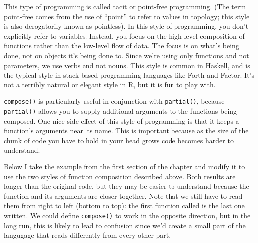 This type of programming is called tacit or point-free programming. (The
term point-free comes from the use of ``point'' to refer to values in
topology; this style is also derogatorily known as pointless). In this
style of programming, you don't explicitly refer to variables. Instead,
you focus on the high-level composition of functions rather than the
low-level flow of data. The focus is on what's being done, not on
objects it's being done to. Since we're using only functions and not
parameters, we use verbs and not nouns. This style is common in Haskell,
and is the typical style in stack based programming languages like Forth
and Factor. It's not a terribly natural or elegant style in R, but it is
fun to play with. 

\texttt{compose()} is particularly useful in conjunction with
\texttt{partial()}, because \texttt{partial()} allows you to supply
additional arguments to the functions being composed. One nice side
effect of this style of programming is that it keeps a function's
arguments near its name. This is important because as the size of the
chunk of code you have to hold in your head grows code becomes harder to
understand.

Below I take the example from the first section of the chapter and
modify it to use the two styles of function composition described above.
Both results are longer than the original code, but they may be easier
to understand because the function and its arguments are closer
together. Note that we still have to read them from right to left
(bottom to top): the first function called is the last one written. We
could define \texttt{compose()} to work in the opposite direction, but
in the long run, this is likely to lead to confusion since we'd create a
small part of the langugage that reads differently from every other
part.

\begin{Shaded}
\end{Shaded}

